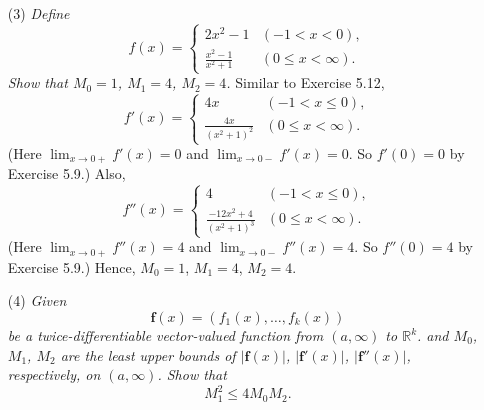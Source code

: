 \documentclass{article}
\begin{document}
\begin{enumerate}
\item[(3)]
\emph{Define
\begin{equation*}
  f(x) =
    \begin{cases}
      2x^2 - 1            & (-1 < x < 0), \\
      \frac{x^2-1}{x^2+1} & (0 \leq x < \infty).
    \end{cases}
\end{equation*}
Show that $M_0 = 1$, $M_1 = 4$, $M_2 = 4$.}
Similar to Exercise 5.12,
\begin{equation*}
  f'(x) =
    \begin{cases}
      4x                   & (-1 < x \leq 0), \\
      \frac{4x}{(x^2+1)^2} & (0 \leq x < \infty).
    \end{cases}
\end{equation*}
(Here $\lim_{x \to 0+} f'(x) = 0$ and $\lim_{x \to 0-} f'(x) = 0$.
So $f'(0) = 0$ by Exercise 5.9.)
Also,
\begin{equation*}
  f''(x) =
    \begin{cases}
      4                          & (-1 < x \leq 0), \\
      \frac{-12x^2+4}{(x^2+1)^3} & (0 \leq x < \infty).
    \end{cases}
\end{equation*}
(Here $\lim_{x \to 0+} f''(x) = 4$ and $\lim_{x \to 0-} f''(x) = 4$.
So $f''(0) = 4$ by Exercise 5.9.)
Hence, $M_0 = 1$, $M_1 = 4$, $M_2 = 4$.

\item[(4)]
\emph{Given
\[
  \mathbf{f}(x) = (f_1(x), \ldots, f_k(x))
\]
be a twice-differentiable vector-valued function from $(a,\infty)$ to $\mathbb{R}^k$.
and $M_0$, $M_1$, $M_2$ are the least upper bounds of
$|\mathbf{f}(x)|$, $|\mathbf{f}'(x)|$, $|\mathbf{f}''(x)|$, respectively, on $(a,\infty)$.
Show that
\[
  M_1^2 \leq 4 M_0 M_2.
\]}


\end{enumerate}
\end{document}
